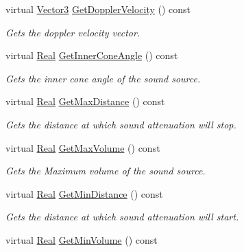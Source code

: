 \begin{DoxyCompactItemize}
virtual \hyperlink{classMezzanine_1_1Vector3}{Vector3} \hyperlink{classMezzanine_1_1Audio_1_1Sound_a472e29b7a9d1f86c92a2a7ba5413ffaf}{GetDopplerVelocity} () const 
\begin{DoxyCompactList}\small\item\em Gets the doppler velocity vector. \item\end{DoxyCompactList}\item 
virtual \hyperlink{namespaceMezzanine_a726731b1a7df72bf3583e4a97282c6f6}{Real} \hyperlink{classMezzanine_1_1Audio_1_1Sound_a2408f6fd02420ee3916306539542f78d}{GetInnerConeAngle} () const 
\begin{DoxyCompactList}\small\item\em Gets the inner cone angle of the sound source. \item\end{DoxyCompactList}\item 
virtual \hyperlink{namespaceMezzanine_a726731b1a7df72bf3583e4a97282c6f6}{Real} \hyperlink{classMezzanine_1_1Audio_1_1Sound_adcf417a8d48223bd828fa58eb0cb8861}{GetMaxDistance} () const 
\begin{DoxyCompactList}\small\item\em Gets the distance at which sound attenuation will stop. \item\end{DoxyCompactList}\item 
virtual \hyperlink{namespaceMezzanine_a726731b1a7df72bf3583e4a97282c6f6}{Real} \hyperlink{classMezzanine_1_1Audio_1_1Sound_a86d99fee746dab624364f7f1104d08e8}{GetMaxVolume} () const 
\begin{DoxyCompactList}\small\item\em Gets the Maximum volume of the sound source. \item\end{DoxyCompactList}\item 
virtual \hyperlink{namespaceMezzanine_a726731b1a7df72bf3583e4a97282c6f6}{Real} \hyperlink{classMezzanine_1_1Audio_1_1Sound_a1907806223280339d63a484f9dc920b6}{GetMinDistance} () const 
\begin{DoxyCompactList}\small\item\em Gets the distance at which sound attenuation will start. \item\end{DoxyCompactList}\item 
virtual \hyperlink{namespaceMezzanine_a726731b1a7df72bf3583e4a97282c6f6}{Real} \hyperlink{classMezzanine_1_1Audio_1_1Sound_a3e62fe64d44d5c707f92c143a786b181}{GetMinVolume} () const 

\end{DoxyCompactItemize}
